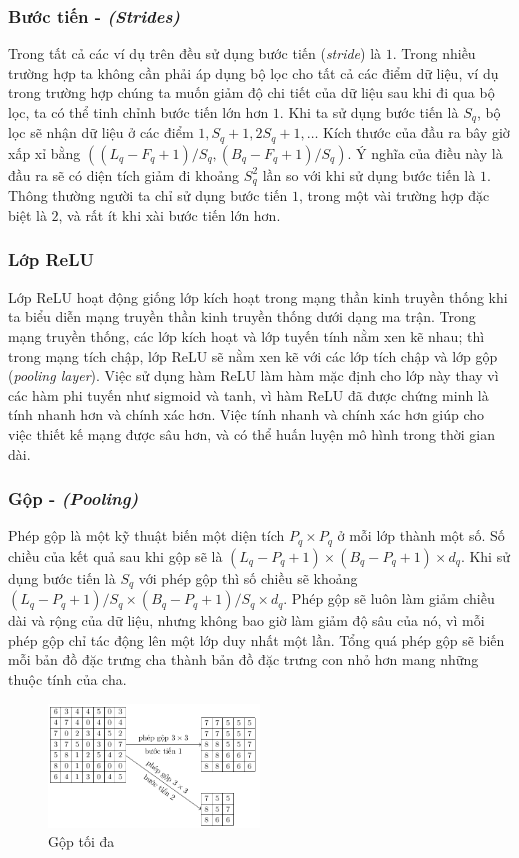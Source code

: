 \subsubsection{Bước tiến - \textit{(Strides)}}
Trong tất cả các ví dụ trên đều sử dụng bước tiến (\textit{stride}) là $1$. Trong nhiều trường hợp ta không cần phải áp dụng bộ lọc cho tất cả các điểm dữ liệu, ví dụ trong trường hợp chúng ta muốn giảm độ chi tiết của dữ liệu sau khi đi qua bộ lọc, ta có thể tinh chỉnh bước tiến lớn hơn $1$. Khi ta sử dụng bước tiến là $S_q$, bộ lọc sẽ nhận dữ liệu ở các điểm $1,S_q+1,2S_q+1,\dots$ Kích thước của đầu ra bây giờ xấp xỉ bằng $\left((L_q-F_q+1)/S_q,(B_q-F_q+1)/S_q\right)$. Ý nghĩa của điều này là đầu ra sẽ có diện tích giảm đi khoảng $S_q^2$ lần so với khi sử dụng bước tiến là $1$. Thông thường người ta chỉ sử dụng bước tiến $1$, trong một vài trường hợp đặc biệt là $2$, và rất ít khi xài bước tiến lớn hơn.

\subsubsection{Lớp ReLU}
Lớp ReLU hoạt động giống lớp kích hoạt trong mạng thần kinh truyền thống khi ta biểu diễn mạng truyền thần kinh truyền thống dưới dạng ma trận. Trong mạng truyền thống, các lớp kích hoạt và lớp tuyến tính nằm xen kẽ nhau; thì trong mạng tích chập, lớp ReLU sẽ nằm xen kẽ với các lớp tích chập và lớp gộp (\textit{pooling layer}). Việc sử dụng hàm ReLU làm hàm mặc định cho lớp này thay vì các hàm phi tuyến như sigmoid và tanh, vì hàm ReLU đã được chứng minh là tính nhanh hơn và chính xác hơn. Việc tính nhanh và chính xác hơn giúp cho việc thiết kế mạng được sâu hơn, và có thể huấn luyện mô hình trong thời gian dài.

\subsubsection{Gộp - \textit{(Pooling)}}
Phép gộp là một kỹ thuật biến một diện tích $P_q\times P_q$ ở mỗi lớp thành một số. Số chiều của kết quả sau khi gộp sẽ là $(L_q-P_q+1)\times (B_q-P_q+1)\times d_q$. Khi sử dụng bước tiến là $S_q$ với phép gộp thì số chiều sẽ khoảng $(L_q-P_q+1)/S_q\times (B_q-P_q+1)/S_q\times d_q$. Phép gộp sẽ luôn làm giảm chiều dài và rộng của dữ liệu, nhưng không bao giờ làm giảm độ sâu của nó, vì mỗi phép gộp chỉ tác động lên một lớp duy nhất một lần. Tổng quá phép gộp sẽ biến mỗi bản đồ đặc trưng cha thành bản đồ đặc trưng con nhỏ hơn mang những thuộc tính của cha.
\begin{figure}[htb]
    \centering
    \includegraphics[width=0.5\textwidth]{tikz_image/cnn_pooling.pdf}
    \caption[Gộp tối đa]{Gộp tối đa \cite{Aggarwal2023-zk}}
    \label{figure:cnn-pooling}
\end{figure}

